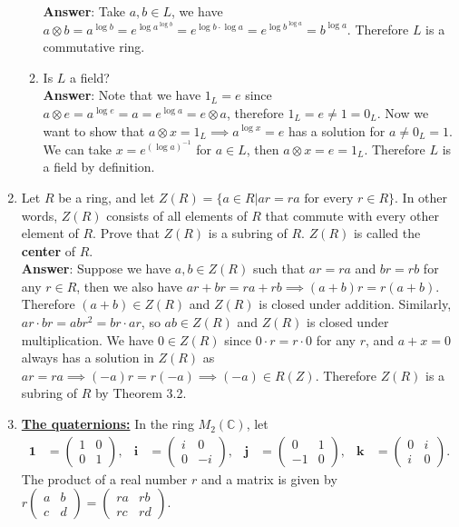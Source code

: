 \documentclass{article}
\begin{document}
\begin{enumerate}
\begin{enumerate}
                        \textbf{Answer}: Take $a,b\in L$, we have $a\otimes b=a^{\log b}=e^{\log a^{\log b}}=e^{\log b\cdot \log a}=e^{\log b^{\log a}}=b^{\log a}$. Therefore $L$ is a commutative ring.
                  \item Is $L$ a field?\\
                        \textbf{Answer}: Note that we have $1_L=e$ since $a\otimes e=a^{\log e}=a=e^{\log a}=e\otimes a$, therefore $1_L=e\neq 1=0_L$. Now we want to show that $a\otimes x=1_L\implies a^{\log x}=e$ has a solution for $a\neq 0_L=1$. We can take $x=e^{(\log a)^{-1}}$ for $a\in L$, then $a\otimes x=e=1_L$. Therefore $L$ is a field by definition.
            \end{enumerate}
      \item Let $R$ be a ring, and let $Z(R)=\{a\in R|ar=ra\text{ for every }r\in R\}$. In other words, $Z(R)$ consists of all elements of $R$ that commute with every other element of $R$. Prove that $Z(R)$ is a subring of $R$. $Z(R)$ is called the \textbf{center} of $R$.\\
            \textbf{Answer}: Suppose we have $a,b\in Z(R)$ such that $ar=ra$ and $br=rb$ for any $r\in R$, then we also have $ar+br=ra+rb\implies (a+b)r=r(a+b)$. Therefore $(a+b)\in Z(R)$ and $Z(R)$ is closed under addition. Similarly, $ar\cdot br=abr^2=br\cdot ar$, so $ab\in Z(R)$ and $Z(R)$ is closed under multiplication. We have $0\in Z(R)$ since $0\cdot r=r\cdot 0$ for any $r$, and $a+x=0$ always has a solution in $Z(R)$ as $ar=ra\implies (-a)r=r(-a)\implies (-a)\in R(Z)$. Therefore $Z(R)$ is a subring of $R$ by Theorem 3.2.
      \item \underline{\bf The quaternions:} In the ring $M_2(\mathbb{C})$, let
            \begin{align*}
                  \textbf{1} & =\begin{pmatrix}1&0\\0&1\end{pmatrix}, &
                  \textbf{i} & =\begin{pmatrix}i&0\\0&-i\end{pmatrix}, &
                  \textbf{j} & =\begin{pmatrix}0&1\\-1&0\end{pmatrix}, &
                  \textbf{k} & =\begin{pmatrix}0&i\\i&0\end{pmatrix}.
            \end{align*}
            The product of a real number $r$ and a matrix is given by $r\begin{pmatrix}a&b\\c&d\end{pmatrix} = \begin{pmatrix}ra&rb\\rc&rd\end{pmatrix}$.


\end{enumerate}
\end{document}

